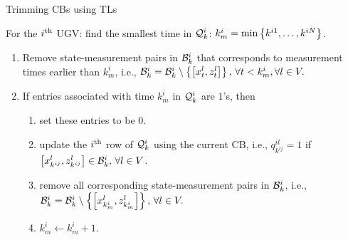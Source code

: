 	
	\begin{algorithm}
		\caption{Trimming CBs using TLs}
		\label{alg:tracklist}
		\begin{algorithmic}
			\State 
			For the $i^\text{th}$ UGV:			
			find the smallest time in $\mathcal{Q}^i_k$: $k^i_m=\min\left\lbrace k^{i1},\dots,k^{iN} \right\rbrace$. 
			\begin{enumerate}
				\item Remove state-measurement pairs in $\mathcal{B}^i_k$ that corresponds to measurement times earlier than $k^i_m$, i.e., $\mathcal{B}^i_k=\mathcal{B}^i_k\setminus \left\lbrace\left[x^l_t,z^l_t\right] \right\rbrace,\,\forall t< k^i_m, \forall l\in V.$
				\item If entries associated with time $k^i_m$ in $\mathcal{Q}^i_k$ are $1$'s, then 
				\begin{enumerate}
					\item set these entries to be $0$.
					\item update the $i^\text{th}$ row of $\mathcal{Q}^i_k$ using the current CB, i.e., $q^{il}_{k^{ij}}=1$ if $\left[x^l_{k^{ij}},z^l_{k^{ij}}\right]\in \mathcal{B}^i_k,\,\forall l\in V$.
					\item remove all corresponding state-measurement pairs in $\mathcal{B}^i_k$, i.e., $\mathcal{B}^i_k=\mathcal{B}^i_k\setminus \left\lbrace\left[x^l_{k^i_m},z^l_{k^i_m}\right] \right\rbrace,\, \forall l\in V.$
					\item $k^i_m \leftarrow k^i_m+1.$
				\end{enumerate}	
			\end{enumerate}				
		\end{algorithmic}
	\end{algorithm}
	
